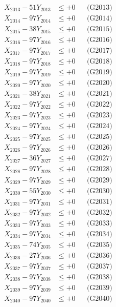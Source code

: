\documentclass[a4paper,10pt]{article}
\begin{document}
{\begin{align}
X_{2013} - 51Y_{2013} &\leq +0 && \text{(G2013)} \\
X_{2014} - 97Y_{2014} &\leq +0 && \text{(G2014)} \\
X_{2015} - 38Y_{2015} &\leq +0 && \text{(G2015)} \\
X_{2016} - 97Y_{2016} &\leq +0 && \text{(G2016)} \\
X_{2017} - 97Y_{2017} &\leq +0 && \text{(G2017)} \\
X_{2018} - 97Y_{2018} &\leq +0 && \text{(G2018)} \\
X_{2019} - 97Y_{2019} &\leq +0 && \text{(G2019)} \\
X_{2020} - 97Y_{2020} &\leq +0 && \text{(G2020)} \\
\allowbreak
X_{2021} - 38Y_{2021} &\leq +0 && \text{(G2021)} \\
X_{2022} - 97Y_{2022} &\leq +0 && \text{(G2022)} \\
X_{2023} - 97Y_{2023} &\leq +0 && \text{(G2023)} \\
X_{2024} - 97Y_{2024} &\leq +0 && \text{(G2024)} \\
X_{2025} - 97Y_{2025} &\leq +0 && \text{(G2025)} \\
X_{2026} - 97Y_{2026} &\leq +0 && \text{(G2026)} \\
X_{2027} - 36Y_{2027} &\leq +0 && \text{(G2027)} \\
X_{2028} - 97Y_{2028} &\leq +0 && \text{(G2028)} \\
X_{2029} - 97Y_{2029} &\leq +0 && \text{(G2029)} \\
X_{2030} - 55Y_{2030} &\leq +0 && \text{(G2030)} \\
\allowbreak
X_{2031} - 97Y_{2031} &\leq +0 && \text{(G2031)} \\
X_{2032} - 97Y_{2032} &\leq +0 && \text{(G2032)} \\
X_{2033} - 97Y_{2033} &\leq +0 && \text{(G2033)} \\
X_{2034} - 97Y_{2034} &\leq +0 && \text{(G2034)} \\
X_{2035} - 74Y_{2035} &\leq +0 && \text{(G2035)} \\
X_{2036} - 27Y_{2036} &\leq +0 && \text{(G2036)} \\
X_{2037} - 97Y_{2037} &\leq +0 && \text{(G2037)} \\
X_{2038} - 97Y_{2038} &\leq +0 && \text{(G2038)} \\
X_{2039} - 97Y_{2039} &\leq +0 && \text{(G2039)} \\
X_{2040} - 97Y_{2040} &\leq +0 && \text{(G2040)} \\

\end{align}}
\end{document}
